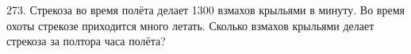 273. Стрекоза во время полёта делает 1300 взмахов крыльями в минуту. Во время охоты стрекозе приходится много летать. Сколько взмахов крыльями делает стрекоза за полтора часа полёта?\\
